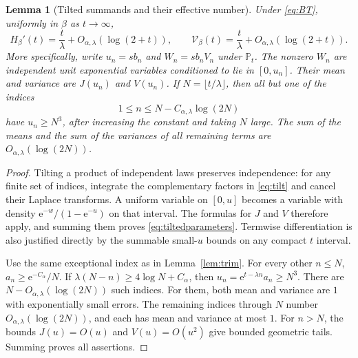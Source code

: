 \documentclass[11pt,a4paper]{article}
\newtheorem{lemma}[theorem]{Lemma}
\theoremstyle{definition}
\theoremstyle{remark}\newtheorem{remark}[theorem]{Remark}
\newcommand{\PP}{\mathbb P}
\newcommand{\VV}{\mathcal V}
\newcommand{\e}{\mathrm e}
\newcommand{\at}{\alpha,\lambda}
\begin{document}
\begin{lemma}[Tilted summands and their effective number]
\label{lem:tilted}
Under \eqref{eq:BT}, uniformly in $\beta$ as $t\to\infty$,
\begin{equation}
 H_\beta'(t)=\frac t\lambda+O_{\at}(\log(2+t)),\qquad
 \VV_\beta(t)=\frac t\lambda+O_{\at}(\log(2+t)).
 \label{eq:derivativeasymptotic}
\end{equation}
More specifically, write $u_n=s b_n$ and $W_n=s b_nV_n$ under $\PP_t$.
The nonzero $W_n$ are independent unit exponential variables conditioned to
lie in $[0,u_n]$.  Their mean and variance are $J(u_n)$ and $V(u_n)$.
If $N=\lfloor t/\lambda\rfloor$, then all but one of the indices
\[
 1\le n\le N-C_{\at}\log(2N)
\]
have $u_n\ge N^3$, after increasing the constant and taking $N$ large.
The sum of the means and the sum of the variances of all remaining terms
are $O_{\at}(\log(2N))$.
\end{lemma}
\begin{proof}
Tilting a product of independent laws preserves independence: for any finite
set of indices, integrate the complementary factors in
\eqref{eq:tilt} and cancel their Laplace transforms.  A uniform variable on
$[0,u]$ becomes a variable with density
$\e^{-w}/(1-\e^{-u})$ on that interval.  The formulas for $J$ and $V$
therefore apply, and summing them proves \eqref{eq:tiltedparameters}.
Termwise differentiation is also justified directly by the summable small-$u$
bounds on any compact $t$ interval.

Use the same exceptional index as in Lemma~\ref{lem:trim}.  For every other
$n\le N$, $a_n\ge\e^{-C_\alpha}/N$.  If
$\lambda(N-n)\ge4\log N+C_\alpha$, then
$u_n=\e^{t-\lambda n}a_n\ge N^3$.
There are $N-O_{\at}(\log(2N))$ such indices.  For them, both mean and
variance are $1$ with exponentially small errors.  The remaining indices
through $N$ number $O_{\at}(\log(2N))$, and each has mean and variance at
most $1$.  For $n>N$, the bounds $J(u)=O(u)$ and $V(u)=O(u^2)$ give
bounded geometric tails.  Summing proves all assertions.
\end{proof}
\end{document}

